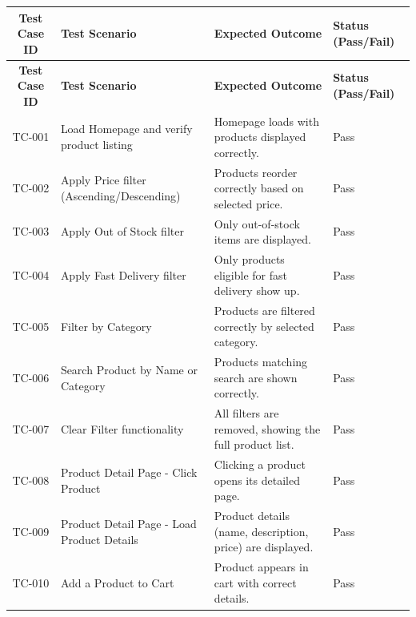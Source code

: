 \documentclass{llncs}
\begin{document}
\renewcommand{\arraystretch}{1.3}
\begin{longtable}{|c|>{\raggedright}p{4.8cm}|p{6cm}|>{\centering\arraybackslash}p{2cm}|}
    \hline
    \textbf{Test Case ID} & \textbf{Test Scenario}                     & \textbf{Expected Outcome}                                 & \textbf{Status (Pass/Fail)} \\ \hline
    \endfirsthead
    \hline
    \textbf{Test Case ID} & \textbf{Test Scenario}                     & \textbf{Expected Outcome}                                 & \textbf{Status (Pass/Fail)} \\ \hline
    \endhead
    TC-001                & Load Homepage and verify product listing   & Homepage loads with products displayed correctly.         &        Pass                 \\ \hline
    TC-002                & Apply Price filter (Ascending/Descending)  & Products reorder correctly based on selected price.       &        Pass                 \\ \hline
    TC-003                & Apply Out of Stock filter                  & Only out-of-stock items are displayed.                    &        Pass                 \\ \hline
    TC-004                & Apply Fast Delivery filter                 & Only products eligible for fast delivery show up.         &        Pass                 \\ \hline
    TC-005                & Filter by Category                         & Products are filtered correctly by selected category.     &        Pass                 \\ \hline
    TC-006                & Search Product by Name or Category         & Products matching search are shown correctly.             &        Pass                 \\ \hline
    TC-007                & Clear Filter functionality                 & All filters are removed, showing the full product list.   &        Pass                 \\ \hline
    TC-008                & Product Detail Page - Click Product        & Clicking a product opens its detailed page.               &        Pass                 \\ \hline
    TC-009                & Product Detail Page - Load Product Details & Product details (name, description, price) are displayed. &        Pass                 \\ \hline
    TC-010                & Add a Product to Cart                      & Product appears in cart with correct details.             &        Pass                 \\ \hline

\end{longtable}
\end{document}
